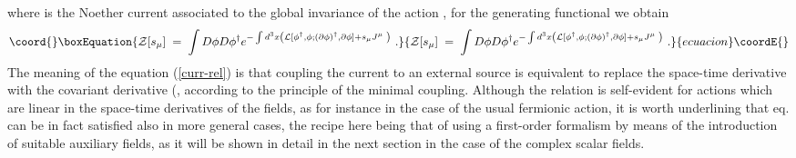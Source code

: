 \documentclass[a4paper,12pt]{article}
\begin{document}
where \coordHE{} is the Noether current associated to the
global \coordHE{} invariance of the action \coordHE{}, for the generating
functional \coordHE{} we obtain
\begin{equation}\coord{}\boxEquation{
  \label{g-f1}
{\mathcal Z}[s_\mu]\;=\; \int D\phi D\phi ^{\dagger }e^{-\int d^3x\left( {\mathcal L}
[\phi^\dagger,\phi;(\partial\phi)^\dagger,\partial\phi] + s_\mu J^\mu \; \right)} \ .
}{
  {\mathcal Z}[s_\mu]\;=\; \int D\phi D\phi ^{\dagger }e^{-\int d^3x\left( {\mathcal L}
[\phi^\dagger,\phi;(\partial\phi)^\dagger,\partial\phi] + s_\mu J^\mu \; \right)} \ .
}{ecuacion}\coordE{}\end{equation}
The meaning of the equation (\ref{curr-rel}) is that coupling the \coordHE{} current\coordHE{} to an external source \coordHE{} is equivalent to
replace the space-time derivative \myHighlight{$\partial _\mu $}\coordHE{} with the covariant derivative (\coordHE{}, according to the principle of the minimal coupling.
Although the relation \myHighlight{$\left( {\rm {\ref{curr-rel}}}\right) $}\coordHE{} is
self-evident for actions which are linear in the space-time
derivatives of the fields, as for instance in the case of the usual
fermionic action, it is worth underlining that eq.\myHighlight{$\left( {\rm
    {\ref{curr-rel}}}\right) $}\coordHE{} can be in fact satisfied also in more
general cases, the recipe here being that of using a first-order
formalism by means of the introduction of suitable auxiliary fields,
as it will be shown in detail in the next section in the case of the
complex scalar fields.
\end{document}
